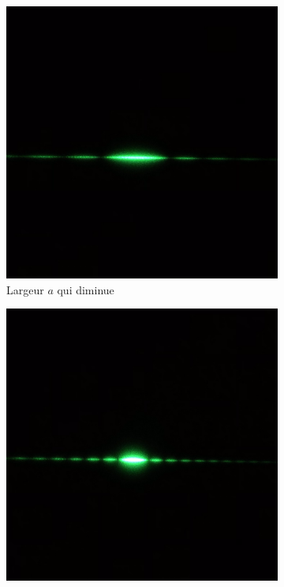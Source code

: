 \documentclass[12pt]{article}
\begin{document}
\begin{figure}[h!]
    \centering
    \begin{subfigure}{.33\textwidth}
      \centering
        \includegraphics[width=.9\linewidth]{img/diffrac_simple_a_diminu.png}
      \caption{Largeur $a$ qui diminue}
      \label{fig:sfig1}
    \end{subfigure}%
    \begin{subfigure}{.33\textwidth}
      \centering
      \includegraphics[width=.9\linewidth]{img/driffac_simple_centre.png}

\end{subfigure}
\end{figure}
\end{document}
